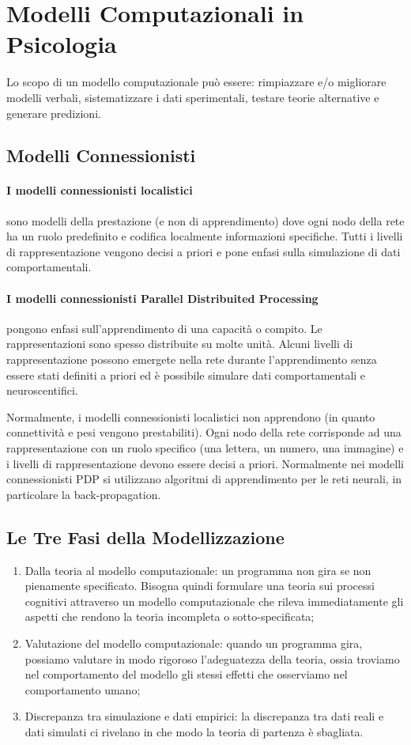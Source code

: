 \section{Modelli Computazionali in Psicologia}
Lo scopo di un modello computazionale può essere: rimpiazzare e/o migliorare modelli verbali, sistematizzare i dati sperimentali, testare teorie alternative e generare predizioni.

\subsection{Modelli Connessionisti}
\paragraph{I modelli connessionisti localistici} sono modelli della prestazione (e non di apprendimento) dove ogni nodo della rete ha un ruolo predefinito e codifica localmente informazioni specifiche. Tutti i livelli di rappresentazione vengono decisi a priori e pone enfasi sulla simulazione di dati comportamentali.
\paragraph{I modelli connessionisti Parallel Distribuited Processing} pongono enfasi sull'apprendimento di una capacità o compito. Le rappresentazioni sono spesso distribuite su molte unità. Alcuni livelli di rappresentazione possono emergete nella rete durante l'apprendimento senza essere stati definiti a priori ed è possibile simulare dati comportamentali e neuroscentifici.

Normalmente, i modelli connessionisti localistici non apprendono (in quanto connettività e pesi vengono prestabiliti). Ogni nodo della rete corrisponde ad una rappresentazione con un ruolo specifico (una lettera, un numero, una immagine) e i livelli di rappresentazione devono essere decisi a priori.
Normalmente nei modelli connessionisti PDP si utilizzano algoritmi di apprendimento per le reti neurali, in particolare la back-propagation.

\subsection{Le Tre Fasi della Modellizzazione}
\begin{enumerate}
    \item Dalla teoria al modello computazionale: un programma non gira se non pienamente specificato. Bisogna quindi formulare una teoria sui processi cognitivi attraverso un modello computazionale che rileva immediatamente gli aspetti che rendono la teoria incompleta o sotto-specificata;
    \item Valutazione del modello computazionale: quando un programma gira, possiamo valutare in modo rigoroso l'adeguatezza della teoria, ossia troviamo nel comportamento del modello gli stessi effetti che osserviamo nel comportamento umano;
    \item Discrepanza tra simulazione e dati empirici: la discrepanza tra dati reali e dati simulati ci rivelano in che modo la teoria di partenza è sbagliata.
\end{enumerate}

